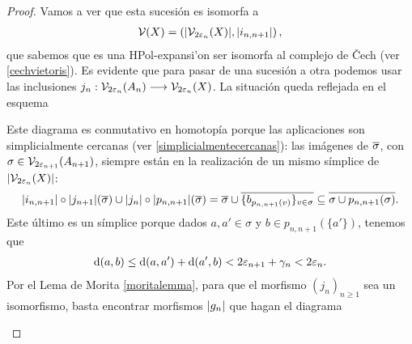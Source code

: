 \begin{proof}
Vamos a ver que esta sucesión es isomorfa a 
\begin{gather*}
   \mathcal{V}(X) =  \left(\abs{\mathcal{V}_{2\varepsilon_n }(X )},\abs{i_{n,n+1}}\right),
\end{gather*} que sabemos que es una HPol-expansi'on ser isomorfa al complejo de \v Cech (ver \ref{cechvietoris}). Es evidente que para pasar de una sucesión a otra podemos usar las inclusiones $ j_n :\mathcal{V}_{2\varepsilon_n}(A_n)\longrightarrow \mathcal{V}_{2\varepsilon_n}(X)$. La situación queda reflejada en el esquema
\begin{center}
\end{center}
Este diagrama es conmutativo en homotopía porque las aplicaciones son simplicialmente cercanas (ver \ref{simplicialmentecercanas}): las imágenes de  $ \overline{\sigma}$, con $\sigma \in \mathcal{V}_{2\varepsilon_{n+1}}(A_{n+1}) $, siempre están en la realización de un mismo símplice de $ \abs{\mathcal{V}_{2\varepsilon_n }(X )} $:
\begin{gather*}
   \abs{i_{n,n+1}}\circ \abs{j_{n+1}} (\overline{\sigma}) \cup  \abs{j_n }\circ \abs{p_{n,n+1}}(\overline{\sigma }) =  \overline{\sigma}\cup \overline{\{b_{p_{n,n+1}(v)}\}_{v\in \sigma}} \subseteq \overline{\sigma\cup p_{n,n+1}(\sigma)}.
\end{gather*}
Este último es un símplice porque  dados $ a,a'\in \sigma  $ y $ b \in  p_{n,n+1}(\{a' \}) $, tenemos que 
\begin{gather*}
 \dd (a,b) \leq \dd (a,a')+\dd (a',b) <2\varepsilon_{n+1}+\gamma_n <2\varepsilon _n .
\end{gather*}
Por el Lema de Morita \ref{moritalemma}, para que el morfismo $ (j_n)_{n\geq 1 } $ sea un isomorfismo, basta encontrar morfismos $ \abs{g_n } $ que hagan el diagrama
\begin{center}
\end{center}
\end{proof}
